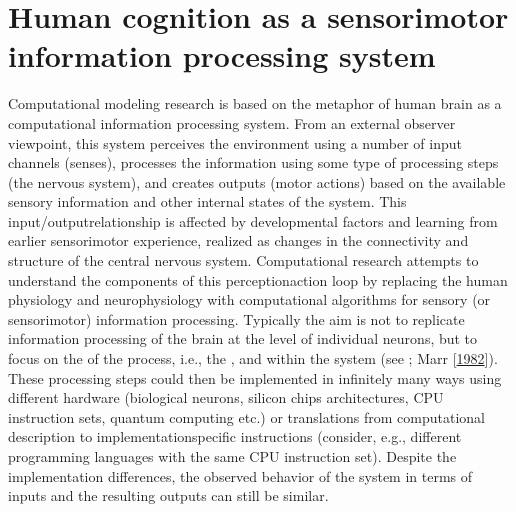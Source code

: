 \documentclass[letterpaper,10pt,english]{jupyterBook}
\begin{document}
\section{Human cognition as a sensorimotor information processing system}
\label{\detokenize{Computational_models_of_human_language_processing:human-cognition-as-a-sensorimotor-information-processing-system}}
\sphinxAtStartPar
Computational modeling research is based on the metaphor of human brain
as a computational information processing system. From an external
observer viewpoint, this system perceives the environment using a number
of input channels (senses), processes the information using some type of
processing steps (the nervous system), and creates outputs (motor
actions) based on the available sensory information and other internal
states of the system. This input/output\sphinxhyphen{}relationship is affected by
developmental factors and learning from earlier sensorimotor experience,
realized as changes in the connectivity and structure of the central
nervous system. Computational research attempts to understand the
components of this perception\sphinxhyphen{}action loop by replacing the human
physiology and neurophysiology with computational algorithms for sensory
(or sensorimotor) information processing. Typically the aim is not to
replicate information processing of the brain at the level of individual
neurons, but to focus on the 
of the process, i.e., the ,  and
 within the system (see ;
Marr {[}\hyperlink{cite.References:id28}{1982}{]}). These processing steps could then be implemented in
infinitely many ways using different hardware (biological neurons,
silicon chips architectures, CPU instruction sets, quantum computing
etc.) or translations from computational description to
implementation\sphinxhyphen{}specific instructions (consider, e.g., different
programming languages with the same CPU instruction set). Despite the
implementation differences, the observed behavior of the system in terms
of inputs and the resulting outputs can still be similar.
\end{document}
